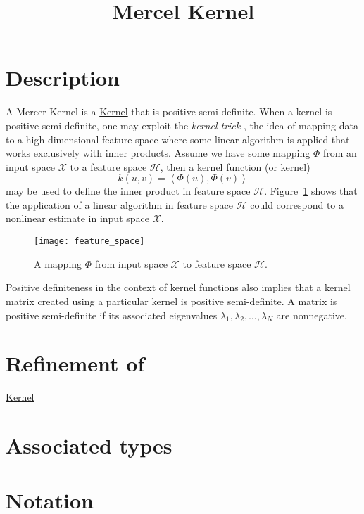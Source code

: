 \documentclass{article}
\begin{document}
\title{Mercel Kernel}
\maketitle

\section*{Description}

A Mercer Kernel is a \href{\kmlroot/reference/kernel.html}{Kernel} that is positive semi-definite.
When a kernel is positive semi-definite, 
one may exploit the \emph{kernel trick} \cite{aizerman64theoretical}, 
the idea of mapping data to a high-dimensional feature space where some linear algorithm is applied that works exclusively with inner products. Assume we have some mapping $\Phi$ from an input space $\mathcal{X}$ to a feature space $\mathcal{H}$, then a kernel function (or kernel)
%
\[ k(u,v)=\left\langle \Phi( u ), \Phi( v ) \right\rangle \]
%
may be used to define the inner product in feature space $\mathcal{H}$.
Figure~\ref{figure:feature_space} shows that the application of a linear algorithm in feature 
space $\mathcal{H}$ could correspond to a nonlinear estimate in input space $\mathcal{X}$.

\begin{figure}
\texttt{[image: feature\_space]}
\caption{A mapping $\Phi$ from input space $\mathcal{X}$ to feature space $\mathcal{H}$.}
\label{figure:feature_space}
\end{figure}

Positive definiteness in the context of kernel functions also implies that a 
kernel matrix created using 
a particular kernel is positive semi-definite. A matrix is positive semi-definite if its associated eigenvalues
$\lambda_1,\lambda_2,\ldots,\lambda_N$ are nonnegative.

\section*{Refinement of}

\href{\kmlroot/reference/kernel.html}{Kernel}

\section*{Associated types}
\section*{Notation}
\end{document}
